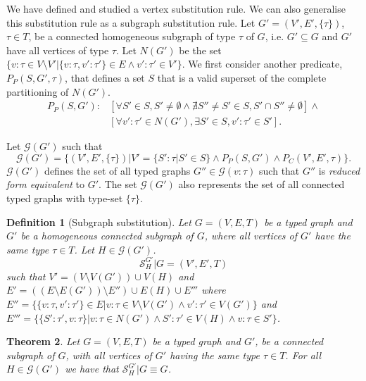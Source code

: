 \documentclass[preprint,12pt]{elsarticle}
\theoremstyle{plain}
\newtheorem{theorem}{Theorem}[section]
\newtheorem{definition}[theorem]{Definition}
\newcommand\tyv[2]{#1\!\!:\!\!#2}
\newcommand\subgraph{\subseteq}
\begin{document}
We have defined and studied a vertex substitution rule.
We can also generalise this substitution rule as a subgraph substitution rule.
Let $G' = (V',E',\{\tau\})$, $\tau\in T$, be a connected homogeneous subgraph of type $\tau$ of $G$,
i.e. $G'\subgraph G$ and $G'$ have all vertices of type $\tau$. 
Let $N(G')$ be the set $\{ \tyv{v}{\tau}\in V\setminus{V'} | \{\tyv{v}{\tau},\tyv{v'}{\tau'}\}\in E \wedge \tyv{v'}{\tau'}\in V'\}$.
We first consider another predicate, $P_P(S, G', \tau)$, that defines a set $S$ that is a valid superset of the complete partitioning of $N(G')$.
\begin{equation*}
\begin{split}
P_P(S, G'): &[\forall S'\in S, S'\neq\emptyset \wedge 
  \nexists S''\neq S' \in S, S'\cap S''\neq\emptyset]\wedge \\
  &[\forall \tyv{v'}{\tau'}\in N(G'), \exists S'\in S, \tyv{v'}{\tau'}\in S'].
\end{split}
\end{equation*}

Let $\mathcal{G}(G')$ such that
\[
\mathcal{G}(G') = \{(V',E',\{\tau\})|
    V'=\{\tyv{S'}{\tau}|S'\in S\}\wedge P_P(S, G') \wedge P_C(V',E',\tau)\}.
\]
$\mathcal{G}(G')$ defines the set of all typed graphs $G''\in\mathcal{G}(\tyv{v}{\tau})$
such that $G''$ is \textit{reduced form equivalent} to $G'$.
The set $\mathcal{G}(G')$ also represents the set of all connected typed graphs with type-set $\{\tau\}$.

\begin{definition}[Subgraph substitution]
Let $G = (V,E,T)$ be a typed graph and
$G'$ be a homogeneous connected subgraph of $G$, where all vertices of $G'$ have the same type $\tau\in T$.
Let $H\in\mathcal{G}(G')$.
\[
\mathcal{S}^{G'}_H|G = (V',E',T)
\]
such that
$V' = (V\setminus V(G'))\cup V(H)$
and
$E' = ((E\setminus E(G'))\setminus E'')\cup E(H)\cup E'''$
where
$E'' = \{ \{\tyv{v}{\tau},\tyv{v'}{\tau'}\}\in E | \tyv{v}{\tau}\in V\setminus{V(G')} \wedge \tyv{v'}{\tau'}\in V(G')\}$
and\\
$E''' = \{ \{\tyv{S'}{\tau'},\tyv{v}{\tau}\}|\tyv{v}{\tau}\in N(G') \wedge \tyv{S'}{\tau'}\in V(H)
           \wedge \tyv{v}{\tau}\in S' \}$.
\end{definition}

\begin{theorem}\label{theorem:subgraphSubstEquiv}
Let $G = (V,E,T)$ be a typed graph and
$G'$, be a connected subgraph of $G$, with all vertices of $G'$ having the same type $\tau\in T$.
For all $H\in\mathcal{G}(G')$ we have that $\mathcal{S}^{G'}_H|G \equiv G$.
\end{theorem}
\end{document}
